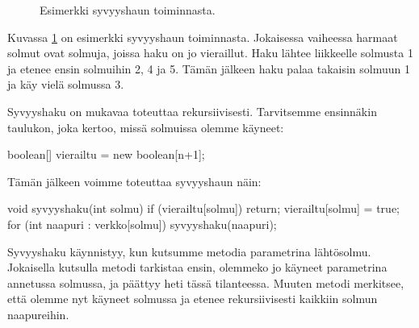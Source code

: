 \begin{figure}
\begin{center}
\end{center}
\caption{Esimerkki syvyyshaun toiminnasta.}
\label{fig:syvhak}
\end{figure}

Kuvassa \ref{fig:syvhak} on esimerkki syvyyshaun toiminnasta.
Jokaisessa vaiheessa harmaat solmut ovat solmuja,
joissa haku on jo vieraillut.
Haku lähtee liikkeelle solmusta 1 ja etenee ensin
solmuihin 2, 4 ja 5.
Tämän jälkeen haku palaa takaisin solmuun 1
ja käy vielä solmussa 3.

Syvyyshaku on mukavaa toteuttaa rekursiivisesti.
Tarvitsemme ensinnäkin taulukon, joka kertoo,
missä solmuissa olemme käyneet:

\begin{code}
boolean[] vierailtu = new boolean[n+1];
\end{code}

Tämän jälkeen voimme toteuttaa syvyyshaun näin:

\begin{code}
void syvyyshaku(int solmu) {
    if (vierailtu[solmu]) return;
    vierailtu[solmu] = true;
    for (int naapuri : verkko[solmu]) {
        syvyyshaku(naapuri);
    }
}
\end{code}

Syvyyshaku käynnistyy, kun kutsumme metodia
parametrina lähtösolmu.
Jokaisella kutsulla metodi tarkistaa ensin,
olemmeko jo käyneet parametrina annetussa solmussa,
ja päättyy heti tässä tilanteessa.
Muuten metodi merkitsee, että olemme nyt käyneet solmussa
ja etenee rekursiivisesti kaikkiin solmun naapureihin.

